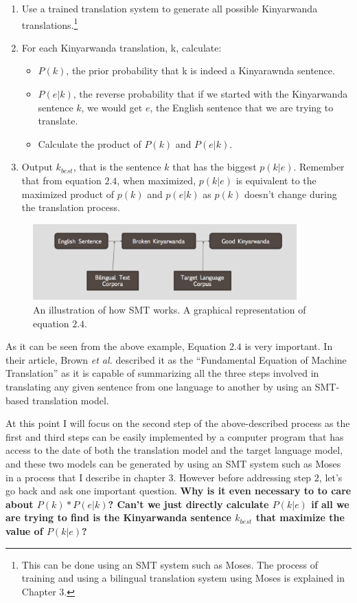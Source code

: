 \begin{enumerate}
    \item Use a trained translation system to generate all possible Kinyarwanda translations.\footnote{This can be done using an SMT system such as Moses. The process of training and using a bilingual translation system using Moses is explained in Chapter 3.}
    \item For each Kinyarwanda translation, k, calculate:
    \begin{itemize}
        \item $P(k)$, the prior probability that k is indeed a Kinyarawnda sentence.
        \item $P(e|k)$, the reverse probability that if we started with the Kinyarwanda sentence $k$, we would get $e$, the English sentence that we are trying to translate.
        \item Calculate the product of $P(k)$ and $P(e|k)$.
    \end{itemize}
    \item Output $k_{best}$, that is the sentence $k$ that has the biggest $p(k|e)$. Remember that from equation $2.4$, when maximized, $p(k|e)$ is equivalent to the maximized product of $p(k)$ and $p(e|k)$ as $p(k)$ doesn't change during the translation process.
\end{enumerate}
\begin{figure}[h]
\begin{center}
\includegraphics[width=4in]{figures/smt_works.png}
\caption{An illustration of how SMT works. A graphical representation of equation $2.4$.}
\end{center}
\end{figure}

As it can be seen from the above example, Equation $2.4$ is very important. In their article, Brown \textit{et al.} described it as the ``Fundamental Equation of Machine Translation''\cite[p. 265]{brown1993mathematics} as it is capable of summarizing all the three steps involved in translating any given sentence from one language to another by using an SMT-based translation model.

At this point I will focus on the second step of the above-described process as the first and third steps can be easily implemented by a computer program that has access to the date of both the translation model and the target language model, and these two models can be generated by using an SMT system such as Moses in a process that I describe in chapter 3. However before addressing step $2$, let's go back and ask one important question. \textbf{Why is it even necessary to to care about $P(k)*P(e|k)$? Can't we just directly calculate $P(k|e)$ if all we are trying to find is the Kinyarwanda sentence $k_{best}$ that maximize the value of $P(k|e)$?}

